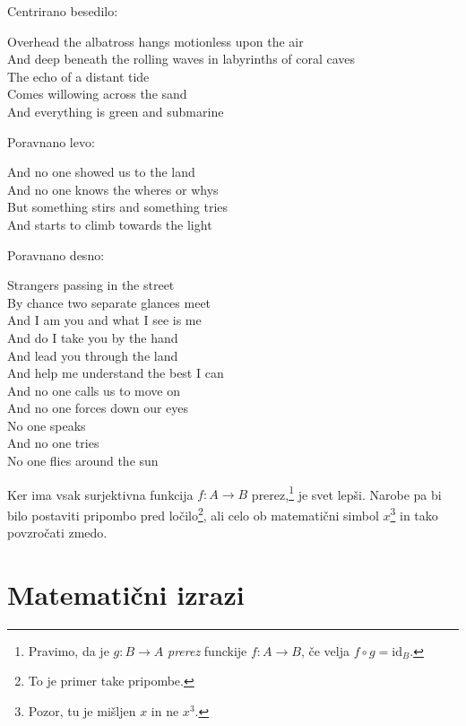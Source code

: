 \documentclass[a4paper]{article}
\begin{document}
\noindent
Centrirano besedilo:
%
\begin{center}
Overhead the albatross hangs motionless upon the air\\
And deep beneath the rolling waves in labyrinths of coral caves\\
The echo of a distant tide\\
Comes willowing across the sand\\
And everything is green and submarine
\end{center}

\noindent
Poravnano levo:
%
\begin{flushleft}
And no one showed us to the land\\
And no one knows the wheres or whys\\
But something stirs and something tries\\
And starts to climb towards the light
\end{flushleft}

\noindent
Poravnano desno:
%
\begin{flushright}
Strangers passing in the street\\
By chance two separate glances meet\\
And I am you and what I see is me\\
And do I take you by the hand\\
And lead you through the land\\
And help me understand the best I can\\
And no one calls us to move on\\
And no one forces down our eyes\\
No one speaks\\
And no one tries\\
No one flies around the sun
\end{flushright}

Ker ima vsak surjektivna funkcija $f : A \to B$ prerez,\footnote{Pravimo, da je
  $g : B \to A$ \emph{prerez} funckije $f : A \to B$, če velja
  $f \circ g = \mathrm{id}_B$.} je svet lepši. Narobe pa bi bilo postaviti pripombo pred
ločilo\footnote{To je primer take pripombe.}, ali celo ob matematični simbol
$x$\footnote{Pozor, tu je mišljen $x$ in ne $x^3$.} in tako povzročati zmedo.

\section{Matematični izrazi}
\end{document}
